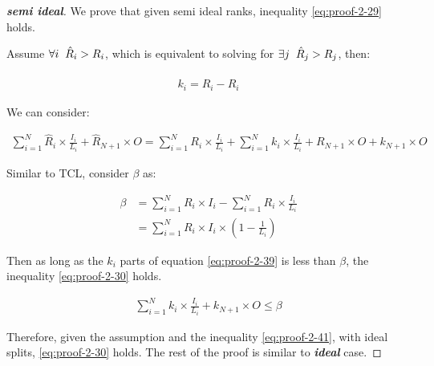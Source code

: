 \documentclass{article}
\begin{document}
\begin{proof}[\textbf{semi ideal}]
	We prove that given semi ideal ranks, inequality \ref{eq:proof-2-29} holds.
	
	Assume $\forall i \hspace{2mm}\hat{R}_i > R_i$, which is equivalent to solving for 
	$\exists j \hspace{2mm}\hat{R}_j > R_j$,
	then:
	
	\begin{align}
		\label{eq:proof-2-38}
		k_i = \hat{R}_i - R_i
	\end{align}

We can consider:

\begin{align}
	\label{eq:proof-2-39}
	\sum_{i=1}^{N} \hat{R}_i \times \frac{I_i}{L_i} + \hat{R}_{N+1}\times O = \sum_{i=1}^{N} R_i \times \frac{I_i}{L_i} + \sum_{i=1}^{N} k_i \times \frac{I_i}{L_i} + R_{N+1}\times O + k_{N+1}\times O
\end{align}

	Similar to TCL, consider $\beta$ as:
	
	\begin{align}
		\label{eq:proof-2-40}
		\beta &= \sum_{i=1}^{N} R_i \times I_i - \sum_{i=1}^{N} R_i \times \frac{I_i}{L_i}
		\nonumber\\
		&= \sum_{i=1}^{N} R_i \times I_i \times (1 - \frac{1}{L_i})
	\end{align}

	Then as long as the $k_i$ parts of equation \ref{eq:proof-2-39} is less than $\beta$, the inequality \ref{eq:proof-2-30} holds.
	
	\begin{align}
		\label{eq:proof-2-41}
		\sum_{i=1}^{N} k_i \times \frac{I_i}{L_i} + k_{N+1}\times O \leq \beta
	\end{align}
	
	Therefore, given the assumption and the inequality \ref{eq:proof-2-41}, with ideal splits, \ref{eq:proof-2-30} holds. The rest of the proof is similar to \textbf{\textit{ideal}} case.
\end{proof}
\end{document}
